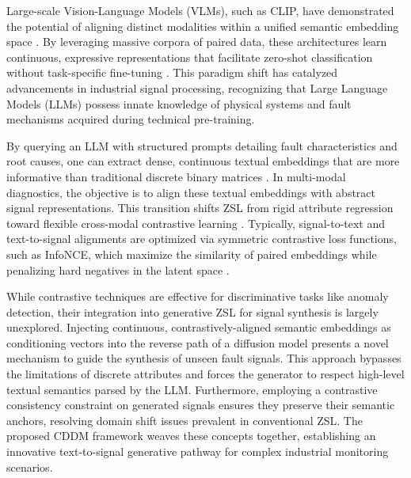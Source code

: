 Large-scale Vision-Language Models (VLMs), such as CLIP, have demonstrated the potential of aligning distinct modalities within a unified semantic embedding space \cite{mikolov2013efficient}. By leveraging massive corpora of paired data, these architectures learn continuous, expressive representations that facilitate zero-shot classification without task-specific fine-tuning \cite{radford2021learning}. This paradigm shift has catalyzed advancements in industrial signal processing, recognizing that Large Language Models (LLMs) \cite{brown2020language,devlin2019bert} possess innate knowledge of physical systems and fault mechanisms acquired during technical pre-training.

By querying an LLM with structured prompts detailing fault characteristics and root causes, one can extract dense, continuous textual embeddings that are more informative than traditional discrete binary matrices \cite{brown2020language}. In multi-modal diagnostics, the objective is to align these textual embeddings with abstract signal representations. This transition shifts ZSL from rigid attribute regression toward flexible cross-modal contrastive learning \cite{chen2020simple}. Typically, signal-to-text and text-to-signal alignments are optimized via symmetric contrastive loss functions, such as InfoNCE, which maximize the similarity of paired embeddings while penalizing hard negatives in the latent space \cite{oord2018representation,chen2020simple}.

While contrastive techniques are effective for discriminative tasks like anomaly detection, their integration into generative ZSL for signal synthesis is largely unexplored. Injecting continuous, contrastively-aligned semantic embeddings as conditioning vectors into the reverse path of a diffusion model presents a novel mechanism to guide the synthesis of unseen fault signals. This approach bypasses the limitations of discrete attributes and forces the generator to respect high-level textual semantics parsed by the LLM. Furthermore, employing a contrastive consistency constraint on generated signals ensures they preserve their semantic anchors, resolving domain shift issues prevalent in conventional ZSL. The proposed CDDM framework weaves these concepts together, establishing an innovative text-to-signal generative pathway for complex industrial monitoring scenarios.